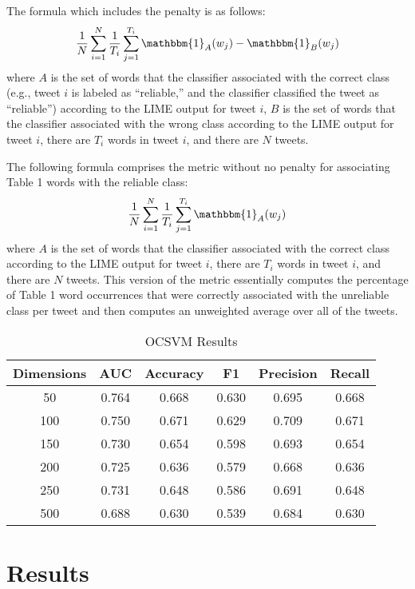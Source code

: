 \documentclass{article}
\begin{document}
The formula which includes the penalty is as follows:
\[\frac{1}{N} \sum_{i=1}^{N} \frac{1}{T_i} \sum_{j=1}^{T_i} \mathbbm{1}_A(w_j) - \mathbbm{1}_B(w_j)\]
where \(A\) is the set of words that the classifier associated with the
correct class (e.g., tweet \(i\) is labeled as ``reliable,'' and the
classifier classified the tweet as ``reliable'') according to the LIME
output for tweet \(i\), \(B\) is the set of words that the classifier
associated with the wrong class according to the LIME output for tweet
\(i\), there are \(T_i\) words in tweet \(i\), and there are \(N\)
tweets.

The following formula comprises the metric without no penalty for
associating Table 1 words with the reliable class:
\[\frac{1}{N} \sum_{i=1}^{N} \frac{1}{T_i} \sum_{j=1}^{T_i} \mathbbm{1}_A(w_j)\]
where \(A\) is the set of words that the classifier associated with the
correct class according to the LIME output for tweet \(i\), there are
\(T_i\) words in tweet \(i\), and there are \(N\) tweets. This version
of the metric essentially computes the percentage of Table 1 word
occurrences that were correctly associated with the unreliable class per
tweet and then computes an unweighted average over all of the tweets.

\begin{table}
 \caption{OCSVM Results}
  \centering
  \begin{tabular}{|c|c|c|c|c|c|}
    \hline
    \rowcolor{lightgray} \textbf{Dimensions} & \textbf{AUC} & \textbf{Accuracy} & \textbf{F1} & \textbf{Precision} & \textbf{Recall} \\
    \hline
    50 & \cellcolor{green} 0.764 & 0.668 & \cellcolor{green} 0.630 & 0.695 & 0.668 \\
    \hline
    \cellcolor{green} 100 & 0.750 & \cellcolor{green} 0.671 & 0.629 & \cellcolor{green} 0.709 & \cellcolor{green} 0.671 \\
    \hline
    150 & 0.730 & 0.654 & 0.598 & 0.693 & 0.654 \\
    \hline
    200 & 0.725 & 0.636 & 0.579 & 0.668 & 0.636 \\
    \hline
    250 & 0.731 & 0.648 & 0.586 & 0.691 & 0.648 \\
    \hline
    500 & 0.688 & 0.630 & 0.539 & 0.684 & 0.630 \\
    \hline
  \end{tabular}
  \label{tab:ocsvm}
\end{table}

\hypertarget{results}{%
\section{Results}\label{results}}
\end{document}
